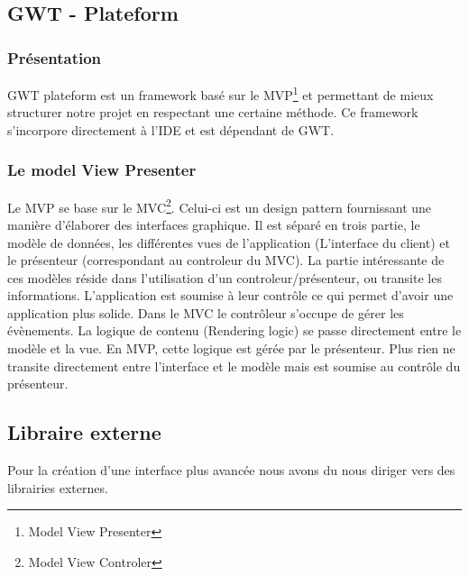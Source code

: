 \subsection{GWT - Plateform}

\subsubsection{Présentation}

GWT plateform est un framework basé sur le MVP\footnote{Model View Presenter} et permettant de mieux structurer notre projet en respectant une certaine méthode. Ce framework s'incorpore directement à l'IDE et est dépendant de GWT.
	
\subsubsection{Le model View Presenter}
Le MVP se base sur le MVC\footnote{Model View Controler}. Celui-ci est un design pattern fournissant une manière d'élaborer des interfaces graphique. Il est séparé en trois partie, le modèle de données, les différentes vues de l'application (L'interface du client) et le présenteur (correspondant au controleur du MVC). La partie intéressante de ces modèles réside dans l'utilisation d'un controleur/présenteur, ou transite les informations. L'application est soumise à leur contrôle ce qui permet d'avoir une application plus solide. Dans le MVC le contrôleur s'occupe de gérer les évènements. La logique de contenu (Rendering logic) se passe directement entre le modèle et la vue. En MVP, cette logique est gérée par le présenteur. Plus rien ne transite directement entre l'interface et le modèle mais est soumise au contrôle du présenteur.

\subsection{Libraire externe}
Pour la création d'une interface plus avancée nous avons du nous diriger vers des librairies externes. 
